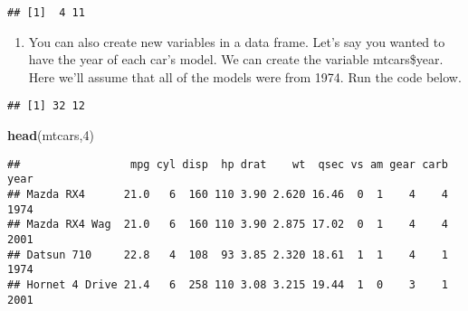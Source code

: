 \documentclass[]{article}
\newenvironment{Shaded}{\begin{snugshade}}{\end{snugshade}}
\newcommand{\KeywordTok}[1]{\textcolor[rgb]{0.13,0.29,0.53}{\textbf{#1}}}
\newcommand{\DecValTok}[1]{\textcolor[rgb]{0.00,0.00,0.81}{#1}}
\newcommand{\StringTok}[1]{\textcolor[rgb]{0.31,0.60,0.02}{#1}}
\newcommand{\OperatorTok}[1]{\textcolor[rgb]{0.81,0.36,0.00}{\textbf{#1}}}
\newcommand{\NormalTok}[1]{#1}
\providecommand{\tightlist}{%
  \setlength{\itemsep}{0pt}\setlength{\parskip}{0pt}}
\begin{document}
\begin{Shaded}
\end{Shaded}

\begin{verbatim}
## [1]  4 11
\end{verbatim}

\begin{enumerate}
\def\labelenumi{\arabic{enumi}.}
\setcounter{enumi}{7}
\tightlist
\item
  You can also create new variables in a data frame. Let's say you
  wanted to have the year of each car's model. We can create the
  variable mtcars\$year. Here we'll assume that all of the models were
  from 1974. Run the code below.
\end{enumerate}

\begin{Shaded}
\end{Shaded}

\begin{verbatim}
## [1] 32 12
\end{verbatim}

\begin{Shaded}
\begin{Highlighting}[]
\KeywordTok{head}\NormalTok{(mtcars,}\DecValTok{4}\NormalTok{)}
\end{Highlighting}
\end{Shaded}

\begin{verbatim}
##                 mpg cyl disp  hp drat    wt  qsec vs am gear carb year
## Mazda RX4      21.0   6  160 110 3.90 2.620 16.46  0  1    4    4 1974
## Mazda RX4 Wag  21.0   6  160 110 3.90 2.875 17.02  0  1    4    4 2001
## Datsun 710     22.8   4  108  93 3.85 2.320 18.61  1  1    4    1 1974
## Hornet 4 Drive 21.4   6  258 110 3.08 3.215 19.44  1  0    3    1 2001
\end{verbatim}
\end{document}
